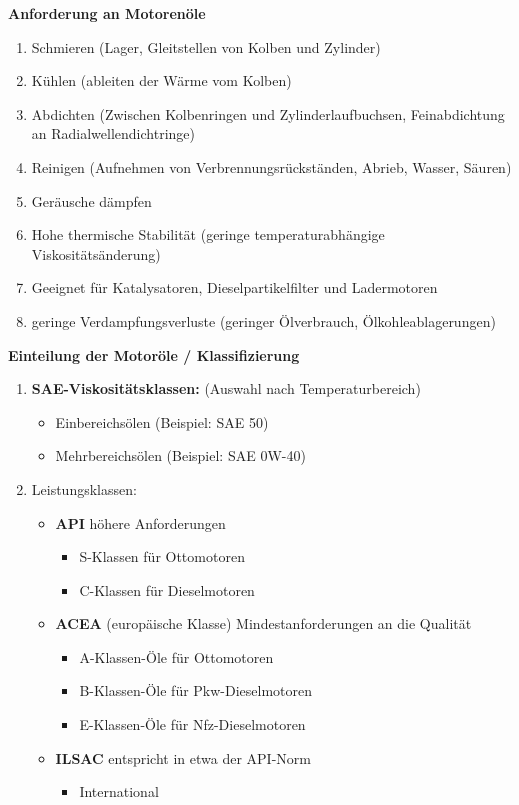 \textbf{Anforderung an Motorenöle}

\begin{enumerate}
\item
  Schmieren (Lager, Gleitstellen von Kolben und Zylinder)
\item
  Kühlen (ableiten der Wärme vom Kolben)
\item
  Abdichten (Zwischen Kolbenringen und Zylinderlaufbuchsen,
  Feinabdichtung an Radialwellendichtringe)
\item
  Reinigen (Aufnehmen von Verbrennungsrückständen, Abrieb, Wasser,
  Säuren)
\item
  Geräusche dämpfen
\item
  Hohe thermische Stabilität (geringe temperaturabhängige
  Viskositätsänderung)
\item
  Geeignet für Katalysatoren, Dieselpartikelfilter und Ladermotoren
\item
  geringe Verdampfungsverluste (geringer Ölverbrauch,
  Ölkohleablagerungen)
\end{enumerate}

\textbf{Einteilung der Motoröle / Klassifizierung}

\begin{enumerate}
\item
  \textbf{SAE-Viskositätsklassen:} (Auswahl nach Temperaturbereich)

  \begin{itemize}
  \item
    Einbereichsölen (Beispiel: SAE 50)
  \item
    Mehrbereichsölen (Beispiel: SAE 0W-40)
  \end{itemize}
\item
  Leistungsklassen:

  \begin{itemize}
  \item
    \textbf{API} höhere Anforderungen

    \begin{itemize}
    \item
      S-Klassen für Ottomotoren
    \item
      C-Klassen für Dieselmotoren
    \end{itemize}
  \item
    \textbf{ACEA} (europäische Klasse) Mindestanforderungen an die
    Qualität

    \begin{itemize}
    \item
      A-Klassen-Öle für Ottomotoren
    \item
      B-Klassen-Öle für Pkw-Dieselmotoren
    \item
      E-Klassen-Öle für Nfz-Dieselmotoren
    \end{itemize}
  \item
    \textbf{ILSAC} entspricht in etwa der API-Norm

    \begin{itemize}
    \item
      International
    \end{itemize}
  \end{itemize}
\end{enumerate}


